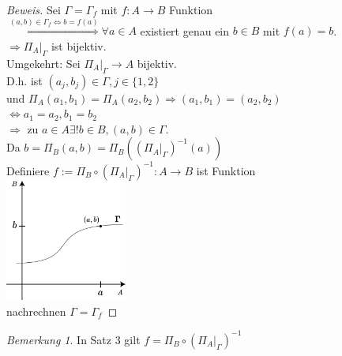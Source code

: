 \documentclass[12pt,a4paper,titlepage]{article} %
\theoremstyle{definition}
\theoremstyle{remark}
\newtheorem*{bem}{Bemerkung}
\newenvironment{bew}{\begin{proof}[Beweis]}{\end{proof}}
\begin{document}
\begin{bew}
	Sei $\Gamma = \Gamma_f$ mit $f: A\rightarrow B$ Funktion\\
	$\overset{(a,b)\in \Gamma_f \Leftrightarrow b = f(a)}{\Rightarrow} \forall a\in A$ existiert genau ein $b\in B$ mit $f(a) = b$.\\
	$\Rightarrow \Pi_A \vert_\Gamma$ ist bijektiv.\\
	Umgekehrt: Sei $\Pi_A \vert_\Gamma \rightarrow A$ bijektiv.\\
	D.h. ist $(a_j, b_j) \in \Gamma, j \in\{1,2\}$\\
	und $\Pi_A(a_1, b_1) = \Pi_A(a_2, b_2) \Rightarrow (a_1, b_1) = (a_2, b_2)$\\
	$\Leftrightarrow a_1 = a_2, b_1 = b_2$\\
	$\Rightarrow$ zu $a\in A \exists ! b\in B, (a,b) \in \Gamma$.\\
	Da $b=\Pi_B(a,b) = \Pi_B((\Pi_A\vert_\Gamma)^{-1}(a))$\\
	Definiere $f:= \Pi_B \circ (\Pi_A\vert_\Gamma)^{-1}:A\rightarrow B$ ist Funktion\\
	\includegraphics[width=0.3\textwidth]{images/img07.png}\\
	nachrechnen $\Gamma = \Gamma_f$
\end{bew}
\begin{bem}
	In Satz 3 gilt $f = \Pi_B \circ (\Pi_A\vert_\Gamma)^{-1}$ %
\end{bem}
\end{document}
